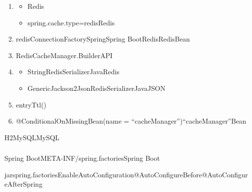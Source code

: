 \begin{enumerate}
\def\labelenumi{\arabic{enumi}.}
\item
  \important{}

  \begin{itemize}
  \tightlist
  \item
    Redis
  \item
    spring.cache.type=redisRedis
  \end{itemize}
\item
  \important{}redisConnectionFactorySpringSpring BootRedisRedisBean
\item
  \important{}RedisCacheManager.BuilderAPI
\item
  \important{}

  \begin{itemize}
  \tightlist
  \item
    \important{}StringRedisSerializerJavaRedis
  \item
    \important{}GenericJackson2JsonRedisSerializerJavaJSON
  \end{itemize}
\item
  entryTtl()
\item
  @ConditionalOnMissingBean(name =
  ``cacheManager'')``cacheManager''Bean
\end{enumerate}

H2MySQLMySQL

\hypertarget{section-28}{%
\subsubsection{}\label{section-28}}

Spring
BootMETA-INF/spring.factoriesSpring
Boot

\important{}jarspring.factoriesEnableAutoConfiguration\important{}\important{}@AutoConfigureBefore@AutoConfigureAfter\important{}Spring

